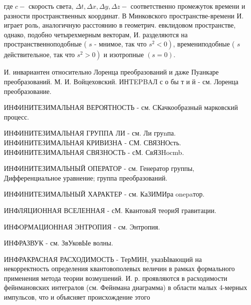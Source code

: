 \documentclass[10pt]{article}
\begin{document}
где $c-$ скорость света, $\Delta t, \Delta x, \Delta y, \Delta z-$ соответственно промежуток времени и разности пространственных координат. В Минковского пространстве-времени И. играет роль, аналогичную расстоянию в геометрич. евклидовом пространстве, однако, подобно четырехмерным векторам, И. разделяются на пространственноподобные ( $s$ - мнимое, так что $\left.s^{2}<0\right)$, времениподобные ( $s$ действительное, так что $\left.s^{2}>0\right)$ и изотропные $(s=0)$.



И. инвариантен относительно Лоренца преобразований и даже Пуанкаре преобразований. М. И. Войцеховский. ИНTEPBAЛ с о бы т и й - см. Лоренца преобразование.



ИНФИНИТЕЗИМАЛЬНАЯ ВЕРОЯТНОСТЬ - см. СКачкообразный марковский процесс.



ИНФИНИТЕЗИМАЛЬНАЯ ГРУППА ЛИ - см. Ли груnпа. ИНФИНИТЕЗИМАЛЬНАЯ КРИВИЗНА - СМ. СВЯЗНОсть. ИНФИНИТЕЗИМАЛЬНАЯ СВЯЗНОСТЬ - сМ. СвЯЗHocmb.



ИНФИНИТЕЗИМАЛЬНЫЙ ОПЕРАТОР - см. Генератор группы, Дифференциальное уравнение; группа преобразований.



ИНФИНИТЕЗИМАЛЬНЫЙ ХАРАКТЕР - см. КаЗИМИра onepaтор.



ИНФЛЯЦИОННАЯ ВСЕЛЕННАЯ - сМ. КвантоваЯ теориЯ гравитации.



ИНФОРМАЦИОННАЯ ЭНТРОПИЯ - см. Энтропия.



ИНФРАЗВУК - см. ЗвУковЫе волны.



ИНФРАКРАСНАЯ РАСХОДИМОСТЬ - ТерМИН, указЫвающий на некорректность определения квантовополевых величин в рамках формального применения метода теории возмушений. И. р. проявляются в расходимости фейнмановских интегралов (см. Фейнмана диаграмма) в области малых 4-мерных импульсов, что и объясняет происхождение этого
\end{document}
